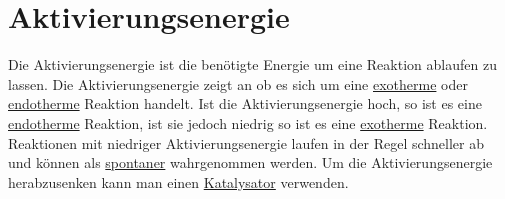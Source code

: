 \section{Aktivierungsenergie} \label{sec:aktivierungsenergie}
Die Aktivierungsenergie ist die benötigte Energie um eine Reaktion ablaufen zu lassen. 
Die Aktivierungsenergie zeigt an ob es sich um eine \hyperref[sec:endo_exotherm]{exotherme} oder \hyperref[sec:endo_exotherm]{endotherme} Reaktion handelt. 
Ist die Aktivierungsenergie hoch, so ist es eine \hyperref[sec:endo_exotherm]{endotherme} Reaktion, ist sie jedoch niedrig so ist es eine \hyperref[sec:endo_exotherm]{exotherme} Reaktion. 
Reaktionen mit niedriger Aktivierungsenergie laufen in der Regel schneller ab und können als \hyperref[sec:spontane_vorgänge]{spontaner} wahrgenommen werden. 
Um die Aktivierungsenergie herabzusenken kann man einen \hyperref[sec:katalysator]{Katalysator} verwenden.

